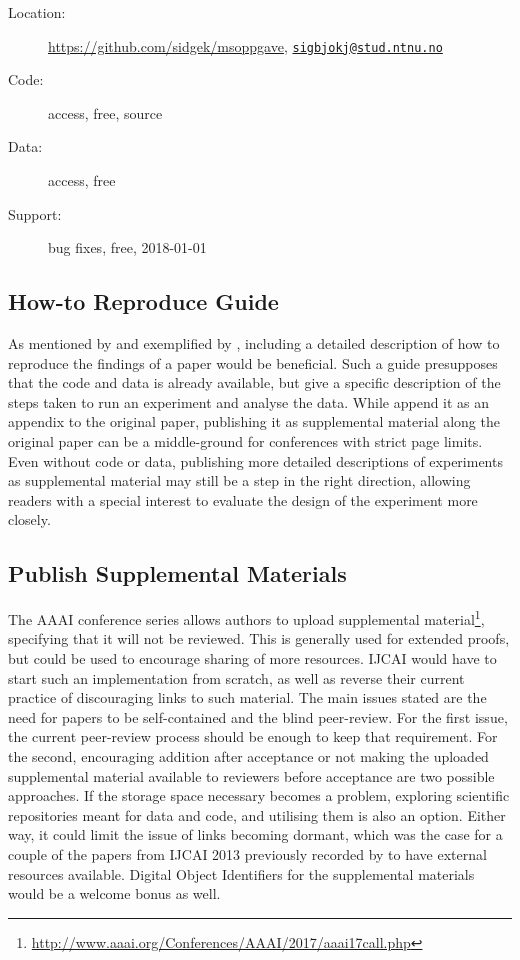 \begin{description}
\item[Location:] \url{https://github.com/sidgek/msoppgave}, \href{mailto:sigbjokj@stud.ntnu.no}{\nolinkurl{sigbjokj@stud.ntnu.no}}
\item[Code:] access, free, source
\item[Data:] access, free
\item[Support:] bug fixes, free, 2018-01-01
\end{description}

\subsection{How-to Reproduce Guide}
As mentioned by \cite{hunold2013state} and exemplified by \cite{dolfi2014model}, including a detailed description of how to reproduce the findings of a paper would be beneficial. Such a guide presupposes that the code and data is already available, but give a specific description of the steps taken to run an experiment and analyse the data. While \cite{dolfi2014model} append it as an appendix to the original paper, publishing it as supplemental material along the original paper can be a middle-ground for conferences with strict page limits. Even without code or data, publishing more detailed descriptions of experiments as supplemental material may still be a step in the right direction, allowing readers with a special interest to evaluate the design of the experiment more closely.

\subsection{Publish Supplemental Materials}
The AAAI conference series allows authors to upload supplemental material\footnote{\url{http://www.aaai.org/Conferences/AAAI/2017/aaai17call.php}}, specifying that it will not be reviewed. This is generally used for extended proofs, but could be used to encourage sharing of more resources. IJCAI would have to start such an implementation from scratch, as well as reverse their current practice of discouraging links to such material. The main issues stated are the need for papers to be self-contained and the blind peer-review. For the first issue, the current peer-review process should be enough to keep that requirement. For the second, encouraging addition after acceptance or not making the uploaded supplemental material available to reviewers before acceptance are two possible approaches. If the storage space necessary becomes a problem, exploring scientific repositories meant for data and code, and utilising them is also an option. Either way, it could limit the issue of links becoming dormant, which was the case for a couple of the papers from IJCAI 2013 previously recorded by \cite{Gundersen2015} to have external resources available. Digital Object Identifiers for the supplemental materials would be a welcome bonus as well.

